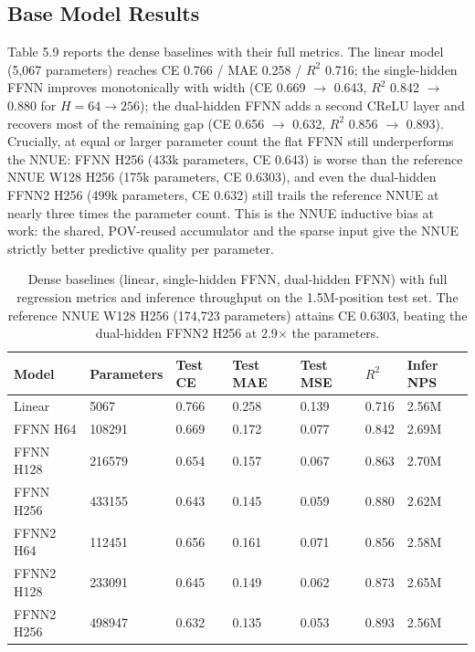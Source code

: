 \subsection{Base Model Results}

Table 5.9 reports the dense baselines with their full metrics. The linear model (5,067 parameters) reaches CE 0.766 / MAE 0.258 / $R^2$ 0.716; the single-hidden FFNN improves monotonically with width (CE 0.669 $\rightarrow$ 0.643, $R^2$ 0.842 $\rightarrow$ 0.880 for $H=64\to256$); the dual-hidden FFNN adds a second CReLU layer and recovers most of the remaining gap (CE 0.656 $\rightarrow$ 0.632, $R^2$ 0.856 $\rightarrow$ 0.893). Crucially, at equal or larger parameter count the flat FFNN still underperforms the NNUE: FFNN H256 (433k parameters, CE 0.643) is worse than the reference NNUE W128 H256 (175k parameters, CE 0.6303), and even the dual-hidden FFNN2 H256 (499k parameters, CE 0.632) still trails the reference NNUE at nearly three times the parameter count. This is the NNUE inductive bias at work: the shared, POV-reused accumulator and the sparse input give the NNUE strictly better predictive quality per parameter.

\begin{table}[H]
\centering
\small
\begin{tabular}{lllllll}
\toprule
Model & Parameters & Test CE & Test MAE & Test MSE & $R^2$ & Infer NPS \\
\midrule
Linear & 5067 & 0.766 & 0.258 & 0.139 & 0.716 & 2.56M \\
FFNN H64 & 108291 & 0.669 & 0.172 & 0.077 & 0.842 & 2.69M \\
FFNN H128 & 216579 & 0.654 & 0.157 & 0.067 & 0.863 & 2.70M \\
FFNN H256 & 433155 & 0.643 & 0.145 & 0.059 & 0.880 & 2.62M \\
FFNN2 H64 & 112451 & 0.656 & 0.161 & 0.071 & 0.856 & 2.58M \\
FFNN2 H128 & 233091 & 0.645 & 0.149 & 0.062 & 0.873 & 2.65M \\
FFNN2 H256 & 498947 & 0.632 & 0.135 & 0.053 & 0.893 & 2.56M \\
\bottomrule
\end{tabular}
\caption{Dense baselines (linear, single-hidden FFNN, dual-hidden FFNN) with full regression metrics and inference throughput on the 1.5M-position test set. The reference NNUE W128 H256 (174,723 parameters) attains CE 0.6303, beating the dual-hidden FFNN2 H256 at 2.9$\times$ the parameters.}
\label{tab:5.9}
\end{table}

